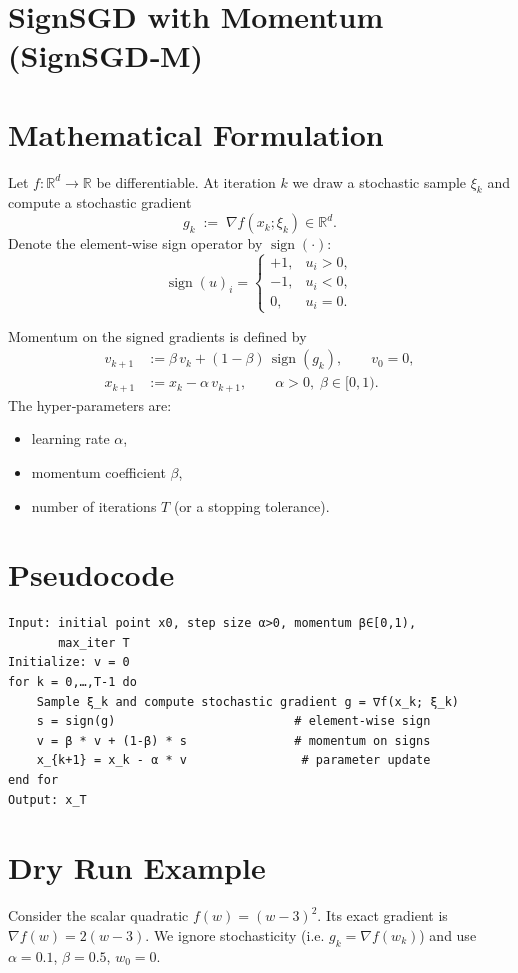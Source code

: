\documentclass[11pt]{article}
\begin{document}
\section*{SignSGD with Momentum (SignSGD‑M)}

\section*{Mathematical Formulation}
Let $f:\mathbb{R}^{d}\to\mathbb{R}$ be differentiable.  
At iteration $k$ we draw a stochastic sample $\xi_k$ and compute a stochastic gradient
\[
g_k \;:=\; \nabla f(x_k;\xi_k)\in\mathbb{R}^{d}.
\]
Denote the element‑wise sign operator by $\operatorname{sign}(\cdot)$:
\[
\operatorname{sign}(u)_i=
\begin{cases}
+1,&u_i>0,\\
-1,&u_i<0,\\
0,&u_i=0.
\end{cases}
\]

Momentum on the signed gradients is defined by
\begin{align}
v_{k+1} &:= \beta\,v_k + (1-\beta)\,\operatorname{sign}(g_k),\qquad v_0=0,\label{eq:momentum}\\
x_{k+1} &:= x_k - \alpha\, v_{k+1},\qquad\alpha>0,\;\beta\in[0,1).\label{eq:update}
\end{align}
The hyper‑parameters are:
\begin{itemize}
    \item learning rate $\alpha$,
    \item momentum coefficient $\beta$,
    \item number of iterations $T$ (or a stopping tolerance).
\end{itemize}

\section*{Pseudocode}
\begin{verbatim}
Input: initial point x0, step size α>0, momentum β∈[0,1), 
       max_iter T
Initialize: v = 0
for k = 0,…,T-1 do
    Sample ξ_k and compute stochastic gradient g = ∇f(x_k; ξ_k)
    s = sign(g)                         # element‑wise sign
    v = β * v + (1-β) * s               # momentum on signs
    x_{k+1} = x_k - α * v                # parameter update
end for
Output: x_T
\end{verbatim}

\section*{Dry Run Example}
Consider the scalar quadratic $f(w)=(w-3)^2$.  
Its exact gradient is $\nabla f(w)=2(w-3)$.  
We ignore stochasticity (i.e. $g_k=\nabla f(w_k)$) and use $\alpha=0.1$, $\beta=0.5$, $w_0=0$.
\end{document}
